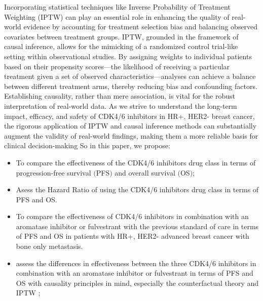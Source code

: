 Incorporating statistical techniques like Inverse Probability of Treatment Weighting (IPTW) can play an essential role in enhancing the quality of real-world evidence by accounting for treatment selection bias and balancing observed covariates between treatment groups. IPTW, grounded in the framework of causal inference, allows for the mimicking of a randomized control trial-like setting within observational studies. By assigning weights to individual patients based on their propensity scores—the likelihood of receiving a particular treatment given a set of observed characteristics—analyses can achieve a balance between different treatment arms, thereby reducing bias and confounding factors. Establishing causality, rather than mere association, is vital for the robust interpretation of real-world data. As we strive to understand the long-term impact, efficacy, and safety of CDK4/6 inhibitors in HR+, HER2- breast cancer, the rigorous application of IPTW and causal inference methods can substantially augment the validity of real-world findings, making them a more reliable basis for clinical decision-making \cite{austinIntroductionPropensityScore2011,austinUsePropensityScore2014}
So in this paper, we propose:
\begin{itemize}
    \item To compare the effectiveness of the CDK4/6 inhibitors drug class in terms of progression-free survival $($PFS$)$ and overall survival $($OS$)$;
\item Asess the Hazard Ratio of using the CDK4/6 inhibitors drug class in terms of PFS and OS.
    \item  To compare the effectiveness of CDK4/6 inhibitors in combination with an aromatase inhibitor or fulvestrant with the previous standard of care in terms of PFS and OS in patients with HR+, HER2- advanced breast cancer with bone only metastasis.

    \item assess the differences in effectiveness between the three CDK4/6 inhibitors in combination with an aromatase inhibitor or fulvestrant in terms of PFS and OS with causality principles in mind, especially the counterfactual theory and IPTW ;
\end{itemize}
